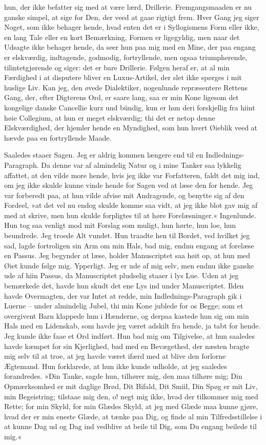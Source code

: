\documentclass[12pt,a4paper]{article}
\begin{document}
hun, der ikke befatter sig med at være lærd, Drillerie. Fremgangsmaaden er nu ganske simpel, at sige for Den, der veed at gaae rigtigt frem. Hver Gang jeg siger Noget, som ikke behager hende, hvad enten det er i Syllogismens Form eller ikke, en lang Tale eller en kort Bemærkning, Formen er ligegyldig, men naar det Udsagte ikke behager hende, da seer hun paa mig med en Mine, der paa engang er elskværdig, indtagende, godmodig, fortryllende, men ogsaa triumpherende, tilintetgjørende og siger: det er bare Drillerie. Følgen heraf er, at al min Færdighed i at disputere bliver en Luxus-Artikel, der slet ikke spørges i mit huslige Liv. Kan jeg, den øvede Dialektiker, nogenlunde repræsentere Rettens Gang, der, efter Digterens Ord, er saare lang, saa er min Kone ligesom det kongelige danske Cancellie kurz und bündig, kun er hun deri forskjellig fra hiint høie Collegium, at hun er meget elskværdig; thi det er netop denne Elskværdighed, der hjemler hende en Myndighed, som hun hvert Øieblik veed at hævde paa en fortryllende Maade.

Saaledes staaer Sagen. Jeg er aldrig kommen længere end til en Indlednings-Paragraph. Da denne var af almindelig Natur og i mine Tanker saa lykkelig affattet, at den vilde more hende, hvis jeg ikke var Forfatteren, faldt det mig ind, om jeg ikke skulde kunne vinde hende for Sagen ved at læse den for hende. Jeg var forberedt paa, at hun vilde afvise mit Andragende, og benytte sig af den Fordeel, »at det vel nu endog skulde komme saa vidt, at jeg ikke blot gav mig af med at skrive, men hun skulde forpligtes til at høre Forelæsninger.« Ingenlunde. Hun tog saa venligt mod mit Forslag som muligt, hun hørte, hun loe, hun beundrede. Jeg troede Alt vundet. Hun traadte hen til Bordet, ved hvilket jeg sad, lagde fortroligen sin Arm om min Hals, bad mig, endnu engang at forelæse en Passus. Jeg begynder at læse, holder Manuscriptet saa høit op, at hun med Øiet kunde følge mig. Ypperligt. Jeg er ude af mig selv, men endnu ikke ganske ude af hiin Passus, da Manuscriptet pludselig staaer i lys Lue. Uden at jeg bemærkede det, havde hun skudt det ene Lys ind under Manuscriptet. Ilden havde Overmagten, der var Intet at redde, min Indlednings-Paragraph gik i Luerne – under almindelig Jubel, thi min Kone jublede for os Begge; som et overgivent Barn klappede hun i Hænderne, og derpaa kastede hun sig om min Hals med en Lidenskab, som havde jeg været adskilt fra hende, ja tabt for hende. Jeg kunde ikke faae et Ord indført. Hun bad mig om Tilgivelse, at hun saaledes havde kæmpet for sin Kjerlighed, bad med en Bevægethed, der næsten bragte mig selv til at troe, at jeg havde været ifærd med at blive den forlorne Ægtemand. Hun forklarede, at hun ikke kunde udholde, at jeg saaledes forandredes. »Din Tanke, sagde hun, tilhører mig, den maa tilhøre mig; Din Opmærksomhed er mit daglige Brød, Dit Bifald, Dit Smiil, Din Spøg er mit Liv, min Begeistring; tilstaae mig den, o! negt mig ikke, hvad der tilkommer mig med Rette; for min Skyld, for min Glædes Skyld, at jeg med Glæde maa kunne gjøre, hvad der er min eneste Glæde, at tænke paa Dig, og finde al min Tilfredsstillelse i at kunne Dag ud og Dag ind vedblive at beile til Dig, som Du engang beilede til mig.«
\end{document}
